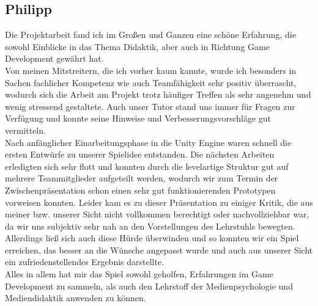 \documentclass[10pt,a4paper,notitlepage]{report}
\begin{document}
	\subsection{Philipp}
	Die Projektarbeit fand ich im Großen und Ganzen eine schöne Erfahrung, die sowohl Einblicke in das Thema Didaktik, aber auch in Richtung Game Development gewährt hat.\\
	Von meinen Mitstreitern, die ich vorher kaum kannte, wurde ich besonders in Sachen fachlicher Kompetenz wie auch Teamfähigkeit sehr positiv überrascht, wodurch sich die Arbeit am Projekt trotz häufiger Treffen als sehr angenehm und wenig stressend gestaltete. Auch unser Tutor stand uns immer für Fragen zur Verfügung und konnte seine Hinweise und Verbesserungsvorschläge gut vermitteln.\\
	Nach anfänglicher Einarbeitungsphase in die Unity Engine waren schnell die ersten Entwürfe zu unserer Spielidee entstanden. Die nächsten Arbeiten erledigten sich sehr flott und konnten durch die levelartige Struktur gut auf mehrere Teammitglieder aufgeteilt werden, wodurch wir zum Termin der Zwischenpräsentation schon einen sehr gut funktionierenden Prototypen vorweisen konnten. Leider kam es zu dieser Präsentation zu einiger Kritik, die aus meiner bzw. unserer Sicht nicht vollkommen berechtigt oder nachvollziehbar war, da wir uns subjektiv sehr nah an den Vorstellungen des Lehrstuhls bewegten. Allerdings ließ sich auch diese Hürde überwinden und so konnten wir ein Spiel erreichen, das besser an die Wünsche angepasst wurde und auch aus unserer Sicht ein zufriedenstellendes Ergebnis darstellte.\\
	Alles in allem hat mir das Spiel sowohl geholfen, Erfahrungen im Game Development zu sammeln, als auch den Lehrstoff der Medienpsychologie und Mediendidaktik anwenden zu können.\\
	
\end{document}
